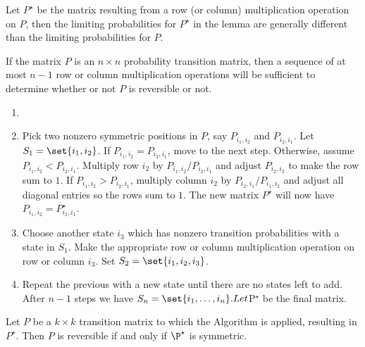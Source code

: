 \documentclass[12pt]{article}
\begin{document}
\begin{remark}
    Let \( P^{\star} \) be the matrix resulting from a row (or column)
    multiplication operation on \( P \), then the limiting probabilities
    for \( P^{\star} \) in the lemma are generally different than the
    limiting probabilities for \( P \).
\end{remark}

If the matrix \( P \) is an \( n \times n \) probability transition
matrix, then a sequence of at most \( n - 1 \) row or column
multiplication operations will be sufficient to determine whether or not
\( P \) is reversible or not.
\begin{enumerate}
    \item
    \item
        Pick two nonzero symmetric positions in \( P \), say \( P_{i_1,i_2}
        \) and \( P_{i_2,i_1} \).  Let \( S_1 = \set{i_1, i_2} \).  If \(
        P_{i_1,i_2} = P_{i_2,i_1} \), move to the next step.  Otherwise,
        assume \( P_{i_1,i_2 }< P_{i_2,i_1} \). Multiply row \( i_2 \)
        by \( P_{i_1,i_2}/P_{i_2,i_1} \) and adjust \( P_{i_2,i_2} \) to
        make the row sum to \( 1 \).  If \( P_{i_1,i_2} > P_{i_2,i_1} \),
        multiply column \( i_2 \) by \( P_{i_2,i_1}/P_{i_1,i_2} \) and
        adjust all diagonal entries so the rows sum to \( 1 \).  The new
        matrix \( P^{\star} \) will now have \( P_{i_1,i_2} = P_{i_2,i_1}^
        {\star} \).
    \item
        Choose another state \( i_3 \) which has nonzero transition
        probabilities with a state in \( S_1 \).  Make the appropriate
        row or column multiplication operation on row or column \( i_3 \).
        Set \( S_2 = \set{i_1, i_2, i_3} \).
    \item
        Repeat the previous with a new state until there are no states
        left to add.  After \( n - 1 \) steps we have \( S_n = \set{i_1,
        \dots, i_n}.  Let \)P\( ^{\star} \) be the final matrix.
\end{enumerate}

\begin{theorem}
    Let \( P \) be a \( k \times k \) transition matrix to which the
    Algorithm is applied, resulting in \( P^{\star} \).  Then \( P \) is
    reversible if and only if \( \P^{\star} \) is symmetric.
\end{theorem}
\end{document}
